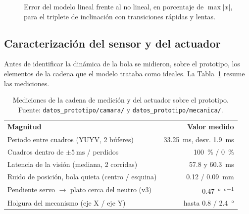 \begin{figure}[!t]
\centering
{}
\caption{Error del modelo lineal frente al no lineal, en porcentaje de $\max|x|$, para el
triplete de inclinación con transiciones rápidas y lentas.}
\label{fig:barrido}
\end{figure}

\subsection{Caracterización del sensor y del actuador}

Antes de identificar la dinámica de la bola se midieron, sobre el prototipo, los elementos de la
cadena que el modelo trataba como ideales. La Tabla~\ref{tab:caracterizacion} resume las
mediciones.

\begin{table}[!t]
\caption{Mediciones de la cadena de medición y del actuador sobre el prototipo. Fuente:
\texttt{datos\_prototipo/camara/} y \texttt{datos\_prototipo/mecanica/}.}
\label{tab:caracterizacion}
\centering
\footnotesize
\begin{tabular}{@{}lr@{}}
\toprule
\textbf{Magnitud} & \textbf{Valor medido} \\
\midrule
Periodo entre cuadros (YUYV, 2 búferes) & \SI{33.25}{\milli\second}, desv. \SI{1.9}{\milli\second} \\
Cuadros dentro de $\pm\SI{5}{\milli\second}$ / perdidos & \SI{100}{\percent} / \SI{0}{\percent} \\
Latencia de la visión (mediana, 2 corridas) & \SI{57.8}{} y \SI{60.3}{\milli\second} \\
Ruido de posición, bola quieta (centro / esquina) & \SI{0.12}{} / \SI{0.09}{\milli\metre} \\
Pendiente servo $\rightarrow$ plato cerca del neutro (v3) & \SI{0.47}{\degree\per\degree} \\
Holgura del mecanismo (eje X / eje Y) & hasta \SI{0.8}{} / \SI{2.4}{\degree} \\
\bottomrule
\end{tabular}
\end{table}

